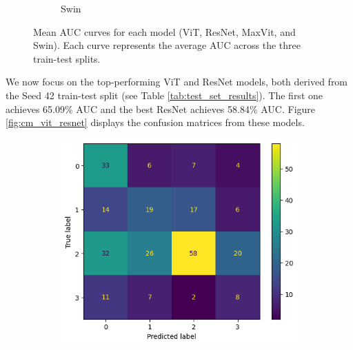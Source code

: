 \documentclass[a4paper,10pt]{book}
\begin{document}
\begin{figure}[h!]
\begin{subfigure}[t]{0.48\textwidth}
        \caption{Swin}
        \label{fig:mean_auc_swin}
    \end{subfigure}
     \caption[Mean AUC Curves]{Mean AUC curves for each model (ViT, ResNet, MaxVit, and Swin). Each curve represents the average AUC across the three train-test splits.}
    \label{fig:mean_auc_images}
\end{figure}

We now focus on the top-performing ViT and ResNet models, both derived from the Seed 42 train-test split (see Table \ref{tab:test_set_results}). The first one achieves 65.09\% AUC and the best ResNet achieves 58.84\% AUC. Figure \ref{fig:cm_vit_resnet} displays the confusion  matrices from these models.

\begin{figure}[h!]
    \centering
    \begin{subfigure}[t]{0.48\textwidth}
        \centering
        \includegraphics[width=\textwidth]{reports/assets/CM-42-ViT.png}
        \caption{}
        \label{fig:cm_vit}
    \end{subfigure}
    \begin{subfigure}[t]{0.48\textwidth}
        \centering

\end{subfigure}
\end{figure}
\end{document}
